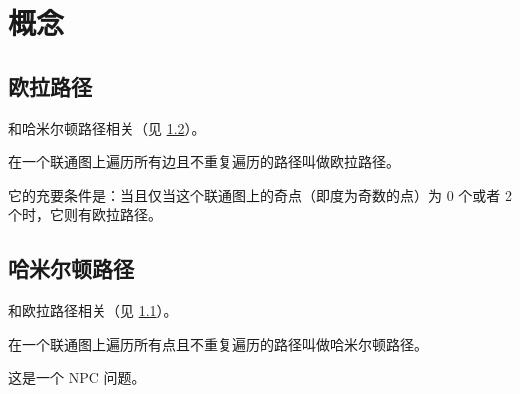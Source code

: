 \section{概念}
\subsection{欧拉路径}\label{subsec:欧拉路径}
和哈米尔顿路径相关（见 \ref{subsec:哈米尔顿路径}）。

在一个联通图上遍历所有边且不重复遍历的路径叫做欧拉路径。

它的充要条件是：当且仅当这个联通图上的奇点（即度为奇数的点）为 0 个或者 2 个时，它则有欧拉路径。

\subsection{哈米尔顿路径}\label{subsec:哈米尔顿路径}
和欧拉路径相关（见 \ref{subsec:欧拉路径}）。

在一个联通图上遍历所有点且不重复遍历的路径叫做哈米尔顿路径。

这是一个 NPC 问题。
